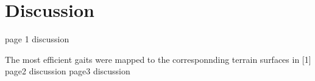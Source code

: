 \chapter{Discussion} \label{chap:discussion}
page 1 discussion

The most efficient gaits were mapped to the corresponnding terrain surfaces in [1]
\newpage
page2 discussion
\newpage
page3 discussion